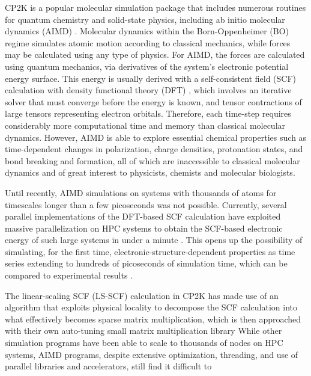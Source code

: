 CP2K \cite{hutter2014cp2k} is a popular molecular simulation package that includes numerous routines for quantum chemistry and solid-state physics, including ab initio molecular dynamics (AIMD) \cite{marx2009ab}. Molecular dynamics within the Born-Oppenheimer (BO) regime simulates atomic motion  according to classical mechanics, while forces may be calculated using any type of physics. For AIMD, the forces are calculated using quantum mechanics, via derivatives of the system's electronic potential energy surface. This energy is usually derived with a self-consistent field (SCF) calculation with density functional theory (DFT) \cite{vandevondele2012linear,hutter2014cp2k}, which involves an iterative solver that must converge before the energy is known, and tensor contractions of large tensors representing electron orbitals. Therefore, each time-step requires considerably more computational time and memory than classical molecular dynamics. However, AIMD is able to explore essential chemical properties such as time-dependent changes in polarization, charge densities, protonation states, and bond breaking and formation, all of which are inaccessible to classical molecular dynamics and of great interest to physicists, chemists and molecular biologists.

Until recently, AIMD simulations on systems with thousands of atoms for timescales longer than a few picoseconds was not possible. Currently, several parallel implementations of the DFT-based SCF calculation have exploited massive parallelization on HPC systems to obtain the SCF-based electronic energy of such large systems in under a minute \cite{vasp_bench,kresse1996efficient,cp2k_bench,vandevondele2012linear}. This opens up the possibility of simulating, for the first time, electronic-structure-dependent properties as time series extending to hundreds of picoseconds of simulation time, which can be compared to experimental results \cite{gillan2016perspective, pestana2017ab, hassanali2013proton, milovanovic2018new, sellner2013charge}.

The linear-scaling SCF (LS-SCF) calculation \cite{vandevondele2012linear} in CP2K has made use of an algorithm that exploits physical locality to decompose the SCF calculation into what effectively becomes sparse matrix multiplication, which is then approached with their own auto-tuning small matrix multiplication library While other simulation programs have been able to scale to thousands of nodes on HPC systems, AIMD programs, despite extensive optimization, threading, and use of parallel libraries and accelerators, still find it difficult to 